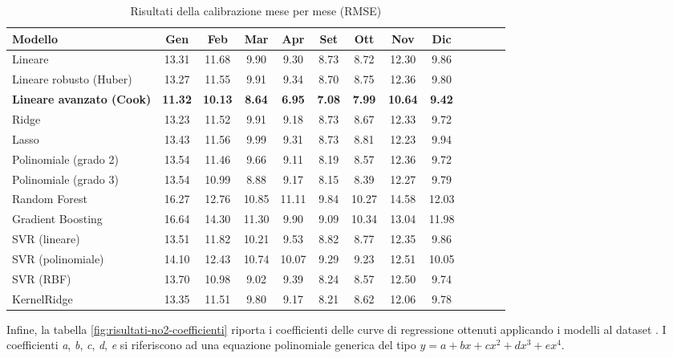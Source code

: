 \begin{table}[H]
    \footnotesize
    \centering
    \def\arraystretch{0.95}
    \setlength{\tabcolsep}{5pt}
    \begin{tabular}{|l|c|c|c|c|c|c|c|c|c|c|c|c|}
    \hline
        \textbf{Modello} & \textbf{Gen} & \textbf{Feb} & \textbf{Mar} & \textbf{Apr} & \textbf{Set} & \textbf{Ott} & \textbf{Nov} & \textbf{Dic} \\ \hline
        Lineare & 13.31 & 11.68 & 9.90 & 9.30 & 8.73 & 8.72 & 12.30 & 9.86 \\ \hline
        Lineare robusto (Huber) & 13.27 & 11.55 & 9.91 & 9.34 & 8.70 & 8.75 & 12.36 & 9.80 \\ \hline
        \textbf{Lineare avanzato (Cook)} & \textbf{11.32} & \textbf{10.13} & \textbf{8.64} & \textbf{6.95} & \textbf{7.08} & \textbf{7.99} & \textbf{10.64} & \textbf{9.42} \\ \hline
        Ridge & 13.23 & 11.52 & 9.91 & 9.18 & 8.73 & 8.67 & 12.33 & 9.72 \\ \hline
        Lasso & 13.43 & 11.56 & 9.99 & 9.31 & 8.73 & 8.81 & 12.23 & 9.94 \\ \hline
        Polinomiale (grado 2) & 13.54 & 11.46 & 9.66 & 9.11 & 8.19 & 8.57 & 12.36 & 9.72 \\ \hline
        Polinomiale (grado 3) & 13.54 & 10.99 & 8.88 & 9.17 & 8.15 & 8.39 & 12.27 & 9.79 \\ \hline
        Random Forest & 16.27 & 12.76 & 10.85 & 11.11 & 9.84 & 10.27 & 14.58 & 12.03 \\ \hline
        Gradient Boosting & 16.64 & 14.30 & 11.30 & 9.90 & 9.09 & 10.34 & 13.04 & 11.98 \\ \hline
        SVR (lineare) & 13.51 & 11.82 & 10.21 & 9.53 & 8.82 & 8.77 & 12.35 & 9.86 \\ \hline
        SVR (polinomiale) & 14.10 & 12.43 & 10.74 & 10.07 & 9.29 & 9.23 & 12.51 & 10.05 \\ \hline
        SVR (RBF) & 13.70 & 10.98 & 9.02 & 9.39 & 8.24 & 8.57 & 12.50 & 9.74 \\ \hline
        KernelRidge & 13.35 & 11.51 & 9.80 & 9.17 & 8.21 & 8.62 & 12.06 & 9.78 \\ \hline
    \end{tabular}
    \caption{Risultati della calibrazione  mese per mese (RMSE)}
    \label{fig:risultati-no2-rmse-mese}
\end{table}

Infine, la tabella \ref{fig:risultati-no2-coefficienti} riporta i coefficienti delle curve di regressione ottenuti applicando i modelli al dataset . I coefficienti \textit{a}, \textit{b}, \textit{c}, \textit{d}, \textit{e} si riferiscono ad una equazione polinomiale generica del tipo $y=a+bx+cx^2+dx^3+ex^4$.

